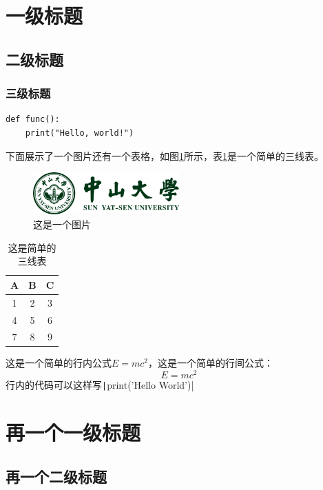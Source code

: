 \documentclass[12pt]{ctexart}
\begin{document}


\section{一级标题}
\subsection{二级标题}
\subsubsection{三级标题}
\begin{verbatim}
def func():
    print("Hello, world!")
\end{verbatim}
下面展示了一个图片还有一个表格，如图\ref{fig:badge}所示，表\ref{tab:table1}是一个简单的三线表。
\begin{figure}[ht]
    \centering
    \includegraphics[width=0.5\textwidth]{figure/badge-horizonal.pdf}
    \caption{这是一个图片}
    \label{fig:badge}
\end{figure}
\begin{table}[ht]
    \centering
    \caption{这是简单的三线表}
    \label{tab:table1}
    \begin{tabular}{ccc}
        \toprule
        \textbf{A} & \textbf{B} & \textbf{C} \\
        \midrule
        1 & 2 & 3 \\
        4 & 5 & 6 \\
        7 & 8 & 9 \\
        \bottomrule
    \end{tabular}
\end{table}
这是一个简单的行内公式$E=mc^2$，这是一个简单的行间公式：
\begin{equation}
    E=mc^2
\end{equation}
行内的代码可以这样写\texttt|print('Hello World')|
\section{再一个一级标题}
\subsection{再一个二级标题}


% 
% 
\end{document}
